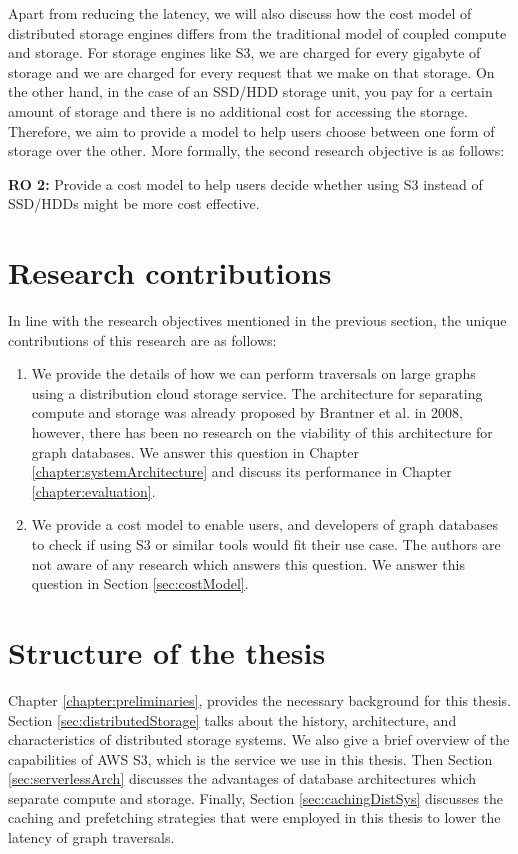 \medskip
Apart from reducing the latency, we will also discuss how the cost model of
distributed storage engines differs from the traditional model of coupled
compute and storage. For storage engines like S3, we are charged for every
gigabyte of storage and we are charged for every request that we make on that
storage. On the other hand, in the case of an SSD/HDD storage unit, you pay for a
certain amount of storage and there is no additional cost for accessing the
storage. Therefore, we aim to provide a model to help users choose between one
form of storage over the other. More formally, the second research objective is
as follows:
\begin{displayquote}
    \textbf{RO 2:} Provide a cost model to help users decide whether using S3
    instead of SSD/HDDs might be more cost effective.
\end{displayquote}

\section{Research contributions}
In line with the research objectives mentioned in the previous section, the 
unique contributions of this research are as follows:
\begin{enumerate}
    \item We provide the details of how we can perform traversals on large
        graphs using a distribution cloud storage service. The architecture for
        separating compute and storage was already proposed by Brantner et
        al.\cite{brantner2008building} in 2008, however, there has been no
        research on the viability of this architecture for graph databases. We
        answer this question in Chapter \ref{chapter:systemArchitecture} and
        discuss its performance in Chapter \ref{chapter:evaluation}.
    \item We provide a cost model to enable users, and developers of graph
        databases to check if using S3 or similar tools would fit their use case.
        The authors are not aware of any research which answers this question.
        We answer this question in Section \ref{sec:costModel}.
\end{enumerate}


\section{Structure of the thesis}

\medskip
Chapter \ref{chapter:preliminaries}, provides the necessary background for
this thesis. Section \ref{sec:distributedStorage} talks about the
history, architecture, and characteristics of distributed storage systems. We
also give a brief overview of the capabilities of AWS S3, which is the service
we use in this thesis. Then
Section \ref{sec:serverlessArch} discusses the advantages of database
architectures which separate compute and storage. Finally, 
Section \ref{sec:cachingDistSys} discusses the caching and prefetching
strategies that were employed in this thesis to lower the latency of graph
traversals.

